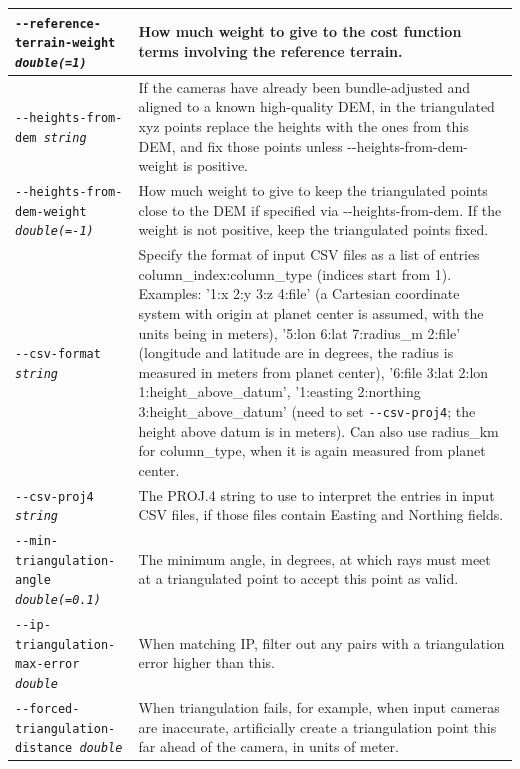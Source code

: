 \begin{longtable}{|p{8cm}|p{9cm}|}
\texttt{-\/-reference-terrain-weight \textit{double(=1)}} & How much weight to give to the cost function terms involving the reference terrain. \\ \hline

\texttt{-\/-heights-from-dem \textit{string} } & If the cameras have already been bundle-adjusted and aligned to a known high-quality DEM, in the triangulated xyz points replace the heights with the ones from this DEM, and fix those points unless -\/-heights-from-dem-weight is positive. \\ \hline

\texttt{-\/-heights-from-dem-weight \textit{double(=-1)}} & How much weight to give to keep the triangulated points close to the DEM if specified via -\/-heights-from-dem. If the weight is not positive, keep the triangulated points fixed. \\ \hline

\texttt{-\/-csv-format \textit{string}} & Specify the format of input
CSV files as a list of entries column\_index:column\_type (indices start
from 1). Examples: '1:x 2:y 3:z 4:file' (a Cartesian coordinate system with
origin at planet center is assumed, with the units being in meters),
'5:lon 6:lat 7:radius\_m 2:file' (longitude and latitude are in degrees, the
radius is measured in meters from planet center), '6:file 3:lat 2:lon
1:height\_above\_datum', '1:easting 2:northing 3:height\_above\_datum'
(need to set \texttt{-\/-csv-proj4}; the height above datum is in
meters). Can also use radius\_km for column\_type, when it is again
measured from planet center.\\ \hline

\texttt{-\/-csv-proj4 \textit{string}} & The PROJ.4 string to use to
interpret the entries in input CSV files, if those files contain Easting
and Northing fields. \\ \hline

\texttt{-\/-min-triangulation-angle \textit{double(=0.1)}} &
The minimum angle, in degrees, at which rays must meet at a triangulated point to accept this point as valid.
\\ \hline

\texttt{-\/-ip-triangulation-max-error \textit{double}} &
When matching IP, filter out any pairs with a triangulation error higher than this.
\\ \hline

\texttt{-\/-forced-triangulation-distance \textit{double}} &
When triangulation fails, for example, when input cameras are inaccurate, artificially create a triangulation point this far ahead of the camera, in units of meter. \\ \hline


\end{longtable}
